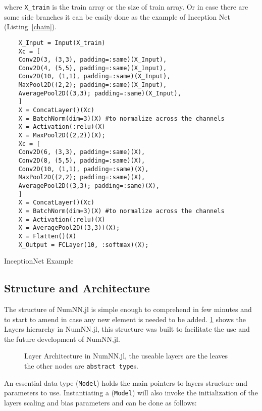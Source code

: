where \texttt{X_train} is the train array or the size of train array. Or in case there are some side branches it can be easily done as the example of Inception Net \cite{Szegedy2016} (Listing~\ref{chain}). 

\begin{listing}[!h]
	\begin{verbatim}
	X_Input = Input(X_train)
	Xc = [
	Conv2D(3, (3,3), padding=:same)(X_Input),
	Conv2D(4, (5,5), padding=:same)(X_Input),
	Conv2D(10, (1,1), padding=:same)(X_Input),
	MaxPool2D((2,2); padding=:same)(X_Input),
	AveragePool2D((3,3); padding=:same)(X_Input),
	]
	X = ConcatLayer()(Xc)
	X = BatchNorm(dim=3)(X) #to normalize across the channels
	X = Activation(:relu)(X)
	X = MaxPool2D((2,2))(X);
	Xc = [
	Conv2D(6, (3,3), padding=:same)(X),
	Conv2D(8, (5,5), padding=:same)(X),
	Conv2D(10, (1,1), padding=:same)(X),
	MaxPool2D((2,2); padding=:same)(X),
	AveragePool2D((3,3); padding=:same)(X),
	]
	X = ConcatLayer()(Xc)
	X = BatchNorm(dim=3)(X) #to normalize across the channels
	X = Activation(:relu)(X)
	X = AveragePool2D((3,3))(X);
	X = Flatten()(X)
	X_Output = FCLayer(10, :softmax)(X);
	\end{verbatim}
	\caption{InceptionNet Example}\label{chain}
\end{listing}


\subsection{Structure and Architecture}\label{subsec:saa}

The structure of NumNN.jl is simple enough to comprehend in few minutes and to start to amend in case any new element is needed to be added. \figurename\ref{fig:layerstruct} shows the Layers hierarchy in NumNN.jl, this structure was built to facilitate the use and the future development of NumNN.jl.

\begin{figure}[!ht]
	\centering
		
	\caption{Layer Architecture in NumNN.jl, the useable layers are the leaves the other nodes are \texttt{abstract type}s.}\label{fig:layerstruct}
\end{figure}

An essential data type (\texttt{Model}) holds the main pointers to layers structure and parameters to use. Instantiating a (\texttt{Model}) will also invoke the initialization of the layers scaling and bias parameters and can be done as follows:

